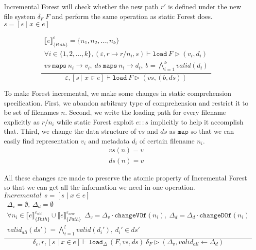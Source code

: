 \documentclass[10pt,twoside,a4paper]{article}
\theoremstyle{theorem}
\theoremstyle{lemma}
\theoremstyle{property}
\theoremstyle{definition}
\theoremstyle{assumption}
\begin{document}
Incremental Forest will check whether the new path $r'$ is defined under the new file system $\delta_F~F$ and perform the same operation as static Forest does.\\

$\boxed{s = [ s \mid x \in e]}$

\begin{displaymath}
	\frac{\begin{array}{c}
		\llbracket e \rrbracket^{\varepsilon}_{\{Path\}} = \{n_1,n_2,\dots,n_k\}\\
		\forall i \in \{1,2,\dots,k\}, (\varepsilon, r \mapsto r/n_i,s) \vdash \mathtt{load}~F \rhd (v_i, d_i)\\
		vs ~\mathtt{maps} ~n_i \to v_i, ~ds ~\mathtt{maps} ~n_i \to d_i, ~b = \bigwedge_{i=1}^k valid(d_i) 
	\end{array}}
	{\varepsilon, [ s \mid x \in e] \vdash \mathtt{load}~F \rhd (vs,(b,ds)) }
\end{displaymath}

To make Forest incremental, we make some changes in static comprehension specification. First, we abandon arbitrary type of comprehension and restrict it to be set of filenames $n$. Second, we write the loading path for every filename explicitly as $r/n_i$ while static Forest exploit $e\!::\!s$ implicitly to help it accomplish that. Third, we change the data structure of $vs$ and $ds$ as $\mathtt{map}$ so that we can easily find representation $v_i$ and metadata $d_i$ of certain filename $n_i$. 
\begin{eqnarray*}
	vs(n) = v \\
	ds(n) = v 
\end{eqnarray*}

All these changes are made to preserve the atomic property of Incremental Forest so that we can get all the information we need in one operation.\\

$\boxed{Incremental~~ s = [ s \mid x \in e]}$
\begin{displaymath}
	\frac{\begin{array}{c}
		\Delta_v = \emptyset, ~\Delta_d = \emptyset\\
		\forall n_i \in \llbracket e \rrbracket^{\varepsilon_{old}}_{\{Path\}} \cup \llbracket e \rrbracket^{\varepsilon_{new}}_{\{Path\}}~~
		\Delta_v = \Delta_v \cdot \mathtt{changeVOf}(n_i),~ \Delta_d = \Delta_d \cdot \mathtt{changeDOf}(n_i)\\
		valid_{all} (ds') = \bigwedge_{i=1}^l valid(d_i'), ~d_i' \in ds'
	\end{array}}
	{\delta_\varepsilon, r, [ s \mid x \in e] \vdash \mathtt{load}_\Delta~ (F,vs,ds)~ \delta_F \rhd (\Delta_v, valid_{all} \leftarrow \Delta_d) }
\end{displaymath}
\end{document}
